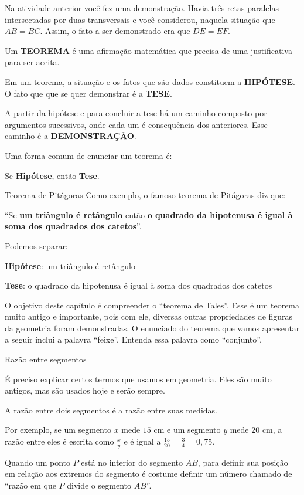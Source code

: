 



Na atividade anterior você fez uma demonstração. Havia três retas paralelas intersectadas por duas transversais e você considerou, naquela situação que  \(AB = BC\). Assim, o fato a ser demonstrado era que \(DE = EF\).

Um \textbf{TEOREMA} é uma afirmação matemática que precisa de uma justificativa para ser aceita.

Em um teorema, a situação e os fatos que são dados constituem a \textbf{HIPÓTESE}. O fato que que se quer demonstrar é a \textbf{TESE}.

A partir da hipótese e para concluir a tese há um caminho composto por argumentos sucessivos, onde cada um é consequência dos anteriores. Esse caminho é a \textbf{DEMONSTRAÇÃO}.

Uma forma comum de enunciar um teorema é:

Se  \textbf{Hipótese},  então \textbf{Tese}.

\begin{example}{Teorema de Pitágoras}
Como exemplo, o famoso teorema de Pitágoras diz que:

“Se \textbf{um triângulo é retângulo} então \textbf{o quadrado da hipotenusa é igual à soma dos quadrados dos catetos}”.

Podemos separar:

\textbf{Hipótese}: um triângulo é retângulo

\textbf{Tese}: o quadrado da hipotenusa é igual à soma dos quadrados dos catetos
\end{example}

O objetivo deste capítulo é compreender o “teorema de Tales”. Esse é um teorema muito antigo e importante, pois com ele, diversas outras propriedades de figuras da geometria foram demonstradas. O enunciado do teorema que vamos apresentar a seguir inclui a palavra “feixe”. Entenda essa palavra como “conjunto”.

Razão entre segmentos

É preciso explicar certos termos que usamos em geometria. Eles são muito antigos, mas são usados hoje e serão sempre.

A razão entre dois segmentos é a razão entre suas medidas.

Por exemplo, se um segmento \(x\) mede $15$ cm e um segmento \(y\) mede $20$ cm, a razão entre eles é escrita como \(\frac{x}{y}\) e é igual a \(\frac{15}{20}=\frac{3}{4}=0,75\).

Quando um ponto \(P\) está no interior do segmento \(AB\), para definir sua posição em relação aos extremos do segmento é costume definir um número chamado de “razão em que \(P\) divide o segmento \(AB\)”.

